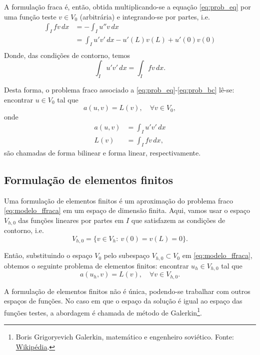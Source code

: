 A formulação fraca é, então, obtida multiplicando-se a equação \eqref{eq:prob_eq} por uma função teste $v\in V_0$ (arbitrária) e integrando-se por partes, i.e.
\begin{align}
  \int_I fv\,dx &= -\int_I u''v\,dx\\
  &= \int_I u'v'\,dx - u'(L)v(L) + u'(0)v(0)\\
\end{align}
Donde, das condições de contorno, temos
\begin{equation}
  \int_I u'v'\,dx = \int_I fv\,dx.
\end{equation}

Desta forma, o problema fraco associado a \eqref{eq:prob_eq}-\eqref{eq:prob_bc} lê-se: encontrar $u\in V_0$ tal que
\begin{equation}\label{eq:modelo_ffraca}
  a(u,v) = L(v),\quad\forall v\in V_0,
\end{equation}
onde
\begin{align}
  a(u,v) &= \int_I u'v'\,dx\label{eq:modelo_fbilinear}\\
  L(v) &= \int_I fv\,dx,\label{eq:modelo_flinear}
\end{align}
são chamadas de forma bilinear e forma linear, respectivamente.

\subsection{Formulação de elementos finitos}

Uma formulação de elementos finitos é um aproximação do problema fraco \eqref{eq:modelo_ffraca} em um espaço de dimensão finita. Aqui, vamos usar o espaço $V_{h,0}$ das funções lineares por partes em $I$ que satisfazem as condições de contorno, i.e.
\begin{equation}
  V_{h,0} = \{v\in V_h:~v(0)=v(L)=0\}.
\end{equation}

Então, substituindo o espaço $V_0$ pelo subespaço $V_{h,0}\subset V_0$ em \eqref{eq:modelo_ffraca}, obtemos o seguinte problema de elementos finitos: encontrar $u_h\in V_{h,0}$ tal que
\begin{equation}\label{eq:modelo_fem}
  a(u_h,v) = L(v),\quad\forall v\in V_{h,0}.
\end{equation}

\begin{obs}
  A formulação de elementos finitos não é única, podendo-se trabalhar com outros espaços de funções. No caso em que o espaço da solução é igual ao espaço das funções testes, a abordagem é chamada de método de Galerkin\footnote{Boris Grigoryevich Galerkin, matemático e engenheiro soviético. Fonte: \href{https://pt.wikipedia.org/wiki/Boris_Galerkin}{Wikipédia}.}.
\end{obs}

